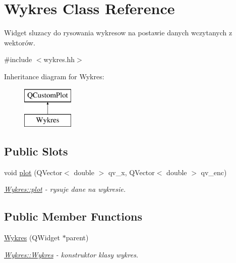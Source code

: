 \hypertarget{class_wykres}{}\section{Wykres Class Reference}
\label{class_wykres}


Widget sluzacy do rysowania wykresow na postawie danych wczytanych z wektorów.  




{\ttfamily \#include $<$wykres.\+hh$>$}

Inheritance diagram for Wykres\+:\begin{figure}[H]
\begin{center}
\leavevmode
\includegraphics[height=2.000000cm]{class_wykres}
\end{center}
\end{figure}
\subsection*{Public Slots}
\begin{DoxyCompactItemize}
\item 
void \hyperlink{class_wykres_a5733ec2d1bef2b52cb8fe1022336d14d}{plot} (Q\+Vector$<$ double $>$ qv\+\_\+x, Q\+Vector$<$ double $>$ qv\+\_\+enc)
\begin{DoxyCompactList}\small\item\em \hyperlink{class_wykres_a5733ec2d1bef2b52cb8fe1022336d14d}{Wykres\+::plot} -\/ rysuje dane na wykresie. \end{DoxyCompactList}\end{DoxyCompactItemize}
\subsection*{Public Member Functions}
\begin{DoxyCompactItemize}
\item 
\hyperlink{class_wykres_ac5bea6ac09cbfa6db96ed1d4827a061f}{Wykres} (Q\+Widget $\ast$parent)
\begin{DoxyCompactList}\small\item\em \hyperlink{class_wykres_ac5bea6ac09cbfa6db96ed1d4827a061f}{Wykres\+::\+Wykres} -\/ konstruktor klasy wykres. \end{DoxyCompactList}\end{DoxyCompactItemize}


